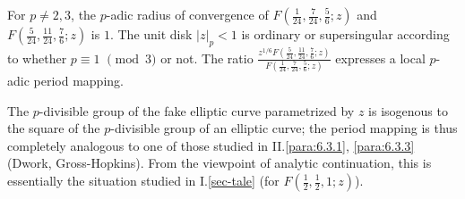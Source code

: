 \begin{para}\label{para::6.5.4} For $p\neq 2,3$, the $p$-adic radius of
 convergence of $F(\frac{1}{24}, \frac{7}{24},\frac{5}{6}; z)$ and 
 $F(\frac{5}{24}, \frac{11}{24},\frac{7}{6}; z)$ is $1$. The unit disk
 $|z|_p<1$ is ordinary or supersingular according 
 to whether $p\equiv 1$ $\pmod{3}$ or not. The ratio 
 $\frac{z^{1/6}F(\frac{5}{24}, \frac{11}{24},\frac{7}{6}; z)
 }{F(\frac{1}{24}, \frac{7}{24},\frac{5}{6}; z)}$ expresses a local 
 $p$-adic period mapping. 

 The $p$-divisible group of the fake elliptic curve parametrized by $z$
 is isogenous to the square of the $p$-divisible group of an elliptic
 curve; the period 
 mapping is thus completely analogous to one of those studied 
 in II.\ref{para:6.3.1}, \ref{para:6.3.3} (Dwork, 
 Gross-Hopkins). From the viewpoint of analytic continuation, this is
 essentially the situation studied in  I.\ref{sec-tale} 
 (for $F(\frac{1}{2},\frac{1}{2},{1}; z)$).
\end{para}

